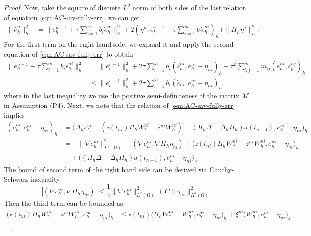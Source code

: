 \documentclass[10pt,final,leqno,onefignum,onetabnum]{siamltex}%
\def\leq{\leqslant}
\def\II{(\Omega)}
\begin{document}
\begin{proof}
Now, take the square of discrete $L^2$ norm of both sides
of the last relation of equation \eqref{eqn:AC-sav-fully-err},
we can get
\begin{equation}\label{eqn:split-0}
\begin{split}
\|\hat e_h^{n}\|_h^2 & = \|e_h^{n-1}+\tau\sum_{i=1}^{m} b_i\dot{e}_h^{ni}\|_h^2
+ 2(\eta^{n}, e_h^{n-1}+ \tau\sum_{i=1}^{m} b_i\dot{e}_h^{ni})_h + \|\Pi_h \eta^{n}\|_h^2.
\end{split}
\end{equation}
For the first term on the right hand side,
we expand it and apply the second equation of \eqref{eqn:AC-sav-fully-err}  to obtain
\begin{align*}
\|e_h^{n-1}+\tau\sum_{i=1}^{m} b_i\dot{e}_h^{ni}\|_h^2
&= \|e_h^{n-1}\|_h^2 + 2\tau\sum_{i=1}^{m}b_i(\dot{e}_h^{ni},e_h^{ni}-\eta_{ni})_h
- \tau^2\sum_{i,j=1}^{m}m_{ij}(\dot{e}_h^{ni}, \dot{e}_h^{nj})_h\\
&\leq \|e_h^{n-1}\|_h^2 + 2\tau\sum_{i=1}^{m}b_i(\dot{e}_{ni},e_h^{ni}-\eta_{ni})_h,
\end{align*}
where in the last inequality we use the positive semi-definiteness of the matrix $\mathcal{M}$ in Assumption (P4).
Next, we note that the relation of \eqref{eqn:AC-sav-fully-err} implies
\begin{equation*}
\begin{split}
(\dot{e}_h^{ni},e_h^{ni}-\eta_{ni})_h
&= \Big(   \Delta_h e_h^{ni} +  (z(t_{ni}) \Pi_h W_*^{ni} - z^{ni} W_h^{ni})
+ (\Pi_h \Delta - \Delta_h \Pi_h) u(t_{n-1}), e_h^{ni}-\eta_{ni} \Big)_h\\
&= -\|\nabla e_h^{ni}\|_{L^2\II}^2 + (\nabla e_h^{ni} , \nabla \Pi_h \eta_{ni})
+  \Big(z(t_{ni}) \Pi_h W_*^{ni} - z^{ni} W_h^{ni}, e_h^{ni}-\eta_{ni}\Big)_h  \\
& \quad +  \Big(  (\Pi_h \Delta - \Delta_h \Pi_h) u(t_{n-1}), e_h^{ni}-\eta_{ni}\Big)_h
\end{split}
\end{equation*}
The bound of second term of the right hand side can be derived via Cauchy-Schwarz inequality
\begin{equation*}
|(\nabla e_h^{ni} , \nabla \Pi_h \eta_{ni})| \le \frac14 \|  \nabla e_h^{ni} \|_{L^2\II}^2 + C \| \eta_{ni}\|_{H^1\II}^2.
\end{equation*}
Then the third term can be bounded as
\begin{equation*}
\begin{split}
  \Big(z(t_{ni}) \Pi_h W_*^{ni} - z^{ni} W_h^{ni}, e_h^{ni}-\eta_{ni} \Big)_h
 & \le z(t_{ni})  \Big( \Pi_h W_*^{ni} -  W_h^{ni}, e_h^{ni}-\eta_{ni} \Big)_h +  \xi^{ni} \Big( W_h^{ni}, e_h^{ni}-\eta_{ni} \Big)_h\\

\end{split}
\end{equation*}
\end{proof}
\end{document}
